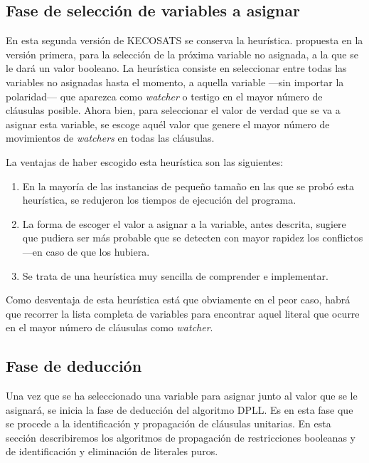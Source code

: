 \documentclass[12pt,lettersize,oneside]{article}
\begin{document}
\subsection{Fase de selección de variables a asignar}\label{ProxVariable}

En esta segunda versión de KECOSATS se conserva la heurística. propuesta en la
versión primera, para la selección de la próxima variable no asignada, a la que
se le dará un valor booleano. La heurística consiste en seleccionar entre todas
las variables no asignadas hasta el momento, a aquella variable ---sin importar
la polaridad--- que aparezca como \emph{watcher} o testigo en el mayor número de
cláusulas posible. Ahora bien, para seleccionar el valor de verdad que se va a
asignar esta variable, se escoge aquél valor que genere el mayor número de
movimientos de \emph{watchers} en todas las cláusulas.

La ventajas de haber escogido esta heurística son las siguientes:
\begin{enumerate}\vspace{-2.5mm}
\item En la mayoría de las instancias de pequeño tamaño en las que se probó esta
  heurística, se redujeron los tiempos de ejecución del programa.
\item La forma de escoger el valor a asignar a la variable, antes descrita,
  sugiere que pudiera ser más probable que se detecten con mayor rapidez los
  conflictos ---en caso de que los hubiera.
\item Se trata de una heurística muy sencilla de comprender e implementar.
\end{enumerate}

Como desventaja de esta heurística está que obviamente en el peor caso, habrá
que recorrer la lista completa de variables para encontrar aquel literal que
ocurre en el mayor número de cláusulas como \emph{watcher}.

\subsection{Fase de deducción}

Una vez que se ha seleccionado una variable para asignar junto al valor que se
le asignará, se inicia la fase de deducción del algoritmo DPLL. Es en esta fase
que se procede a la identificación y propagación de cláusulas unitarias. En esta
sección describiremos los algoritmos de propagación de restricciones booleanas y
de identificación y eliminación de literales puros.
\end{document}
